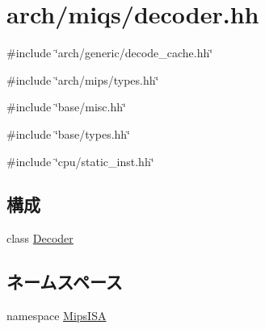\hypertarget{miqs_2decoder_8hh}{
\section{arch/miqs/decoder.hh}
\label{miqs_2decoder_8hh}
}
{\ttfamily \#include \char`\"{}arch/generic/decode\_\-cache.hh\char`\"{}}\par
{\ttfamily \#include \char`\"{}arch/mips/types.hh\char`\"{}}\par
{\ttfamily \#include \char`\"{}base/misc.hh\char`\"{}}\par
{\ttfamily \#include \char`\"{}base/types.hh\char`\"{}}\par
{\ttfamily \#include \char`\"{}cpu/static\_\-inst.hh\char`\"{}}\par
\subsection*{構成}
\begin{DoxyCompactItemize}
\item 
class \hyperlink{classMipsISA_1_1Decoder}{Decoder}
\end{DoxyCompactItemize}
\subsection*{ネームスペース}
\begin{DoxyCompactItemize}
\item 
namespace \hyperlink{namespaceMipsISA}{MipsISA}
\end{DoxyCompactItemize}
